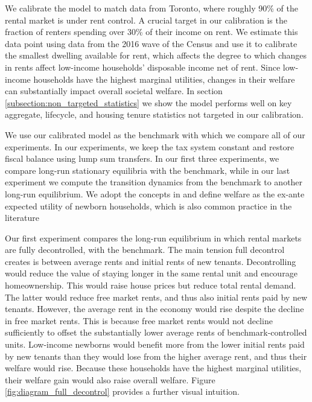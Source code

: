 \documentclass[parskip=full]{article}
\begin{document}
We calibrate the model to match data from Toronto, where roughly 90\% of the rental market is under rent control. A crucial target in our calibration is the fraction of renters spending over 30\% of their income on rent. We estimate this data point using data from the 2016 wave of the Census and use it to calibrate the smallest dwelling available for rent, which affects the degree to which changes in rents affect low-income households' disposable income net of rent. Since low-income households have the highest marginal utilities, changes in their welfare can substantially impact overall societal welfare. In section \ref{subsection:non_targeted_statistics} we show the model performs well on key aggregate, lifecycle, and housing tenure statistics not targeted in our calibration.

We use our calibrated model as the benchmark with which we compare all of our experiments. In our experiments, we keep the tax system constant and restore fiscal balance using lump sum transfers. In our first three experiments, we compare long-run stationary equilibria with the benchmark, while in our last experiment we compute the transition dynamics from the benchmark to another long-run equilibrium. We adopt the concepts in \citet{ralws-1971} and define welfare as the ex-ante expected utility of newborn households, which is also common practice in the literature \citep{conesa-et-al,gkkoc}

Our first experiment compares the long-run equilibrium in which rental markets are fully decontrolled, with the benchmark. The main tension full decontrol creates is between average rents and initial rents of new tenants. Decontrolling would reduce the value of staying longer in the same rental unit and encourage homeownership. This would raise house prices but reduce total rental demand. The latter would reduce free market rents, and thus also initial rents paid by new tenants. However, the average rent in the economy would rise despite the decline in free market rents. This is because free market rents would not decline sufficiently to offset the substantially lower average rents of benchmark-controlled units. Low-income newborns would benefit more from the lower initial rents paid by new tenants than they would lose from the higher average rent, and thus their welfare would rise. Because these households have the highest marginal utilities, their welfare gain would also raise overall welfare. Figure \ref{fig:diagram_full_decontrol} provides a further visual intuition.
\end{document}
